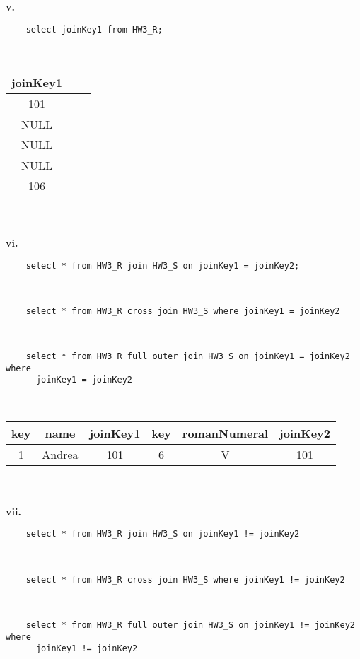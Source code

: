 \documentclass[12pt, letterpaper, fleqn]{article}
\begin{document}
  \textbf{v.}\\
  \begin{verbatim}
    select joinKey1 from HW3_R;
  \end{verbatim}\\

  \begin{tabular}{ c c c }
    joinKey1 \\
    \hline 
    101 \\
    NULL \\
    NULL \\
    NULL \\
    106 \\
  \end{tabular} \\\\

  \textbf{vi.}\\
  \begin{verbatim}
    select * from HW3_R join HW3_S on joinKey1 = joinKey2;
  \end{verbatim}\\
  \begin{verbatim}
    select * from HW3_R cross join HW3_S where joinKey1 = joinKey2
  \end{verbatim}\\
  \begin{verbatim}
    select * from HW3_R full outer join HW3_S on joinKey1 = joinKey2 where
      joinKey1 = joinKey2
  \end{verbatim}\\

  \begin{tabular}{ c c c c c c }
    key & name & joinKey1 & key & romanNumeral & joinKey2 \\
    \hline 
    1	& Andrea & 101 &	6	& V	& 101
  \end{tabular} \\\\

  \textbf{vii.}\\
  \begin{verbatim}
    select * from HW3_R join HW3_S on joinKey1 != joinKey2
  \end{verbatim}\\
  \begin{verbatim}
    select * from HW3_R cross join HW3_S where joinKey1 != joinKey2
  \end{verbatim}\\
  \begin{verbatim}
    select * from HW3_R full outer join HW3_S on joinKey1 != joinKey2 where
      joinKey1 != joinKey2
  \end{verbatim}\\
\end{document}
